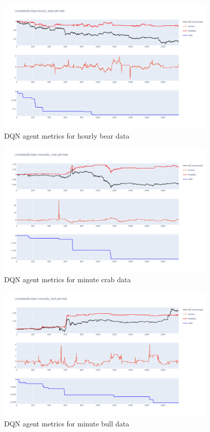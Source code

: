 \begin{figure}[H]
    \centering
    \includegraphics[width=0.94\textwidth]{graphics/testphoto/dqn-hbr.png}
    \caption{DQN agent metrics for hourly bear data}
    \label{f-dqn-hbr}
\end{figure}

\begin{figure}[H]
    \centering
    \includegraphics[width=0.94\textwidth]{graphics/testphoto/dqn-mcr.png}
    \caption{DQN agent metrics for minute crab data}
    \label{f-dqn-mcr}
\end{figure}

\begin{figure}[H]
    \centering
    \includegraphics[width=0.94\textwidth]{graphics/testphoto/dqn-mbu.png}
    \caption{DQN agent metrics for minute bull data}
    \label{f-dqn-mbu}
\end{figure}

